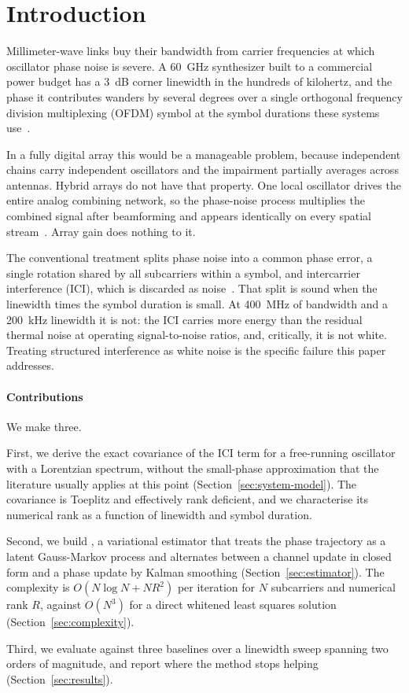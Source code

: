 \section{Introduction}
\label{sec:introduction}

Millimeter-wave links buy their bandwidth from carrier frequencies at which
oscillator phase noise is severe. A 60~GHz synthesizer built to a commercial
power budget has a 3~dB corner linewidth in the hundreds of kilohertz, and the
phase it contributes wanders by several degrees over a single orthogonal
frequency division multiplexing (OFDM) symbol at the symbol durations these
systems use~\citep{nakagome2019oscillator}.

In a fully digital array this would be a manageable problem, because
independent chains carry independent oscillators and the impairment partially
averages across antennas. Hybrid arrays do not have that property. One local
oscillator drives the entire analog combining network, so the phase-noise
process multiplies the combined signal after beamforming and appears identically
on every spatial stream~\citep{oyelaran2020hybrid}. Array gain does nothing to
it.

The conventional treatment splits phase noise into a common phase error, a
single rotation shared by all subcarriers within a symbol, and intercarrier
interference (ICI), which is discarded as
noise~\citep{bertrand2018commonphase}. That split is sound when the linewidth
times the symbol duration is small. At 400~MHz of bandwidth and a 200~kHz
linewidth it is not: the ICI carries more energy than the residual thermal
noise at operating signal-to-noise ratios, and, critically, it is not white.
Treating structured interference as white noise is the specific failure this
paper addresses.

\paragraph*{Contributions}
We make three.

First, we derive the exact covariance of the ICI term for a free-running
oscillator with a Lorentzian spectrum, without the small-phase approximation
that the literature usually applies at this point
(Section~\ref{sec:system-model}). The covariance is Toeplitz and effectively
rank deficient, and we characterise its numerical rank as a function of
linewidth and symbol duration.

Second, we build \est, a variational estimator that treats the phase trajectory
as a latent Gauss-Markov process and alternates between a channel update in
closed form and a phase update by Kalman smoothing
(Section~\ref{sec:estimator}). The complexity is $O(N \log N + N R^2)$ per
iteration for $N$ subcarriers and numerical rank $R$, against $O(N^3)$ for a
direct whitened least squares solution (Section~\ref{sec:complexity}).

Third, we evaluate against three baselines over a linewidth sweep spanning two
orders of magnitude, and report where the method stops helping
(Section~\ref{sec:results}).
